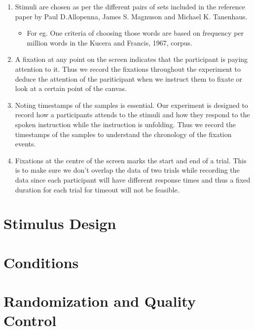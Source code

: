 \documentclass[
  a4paper,
]{article}
\providecommand{\tightlist}{%
  \setlength{\itemsep}{0pt}\setlength{\parskip}{0pt}}\usepackage{longtable,booktabs,array}
\begin{document}
\begin{enumerate}
\def\labelenumi{\arabic{enumi}.}
\item
  Stimuli are chosen as per the different pairs of sets included in the
  reference paper by Paul D.Allopenna, James S. Magnuson and Michael K.
  Tanenhaus.

  \begin{itemize}
  \tightlist
  \item
    For eg. One criteria of choosing those words are based on frequency
    per million words in the Kucera and Francis, 1967, corpus.
  \end{itemize}
\item
  A fixation at any point on the screen indicates that the participant
  is paying attention to it. Thus we record the fixations throughout the
  experiment to deduce the attention of the pariticipant when we
  instruct them to fixate or look at a certain point of the canvas.
\item
  Noting timestamps of the samples is essential. Our experiment is
  designed to record how a participants attends to the stimuli and how
  they respond to the spoken instruction while the instruction is
  unfolding. Thus we record the timestamps of the samples to understand
  the chronology of the fixation events.
\item
  Fixations at the centre of the screen marks the start and end of a
  trial. This is to make sure we don't overlap the data of two trials
  while recording the data since each participant will have different
  response times and thus a fixed duration for each trial for timeout
  will not be feasible.
\end{enumerate}

\hypertarget{stimulus-design}{%
\section{Stimulus Design}\label{stimulus-design}}

\hypertarget{conditions}{%
\section{Conditions}\label{conditions}}

\hypertarget{randomization-and-quality-control}{%
\section{Randomization and Quality
Control}\label{randomization-and-quality-control}}
\end{document}
